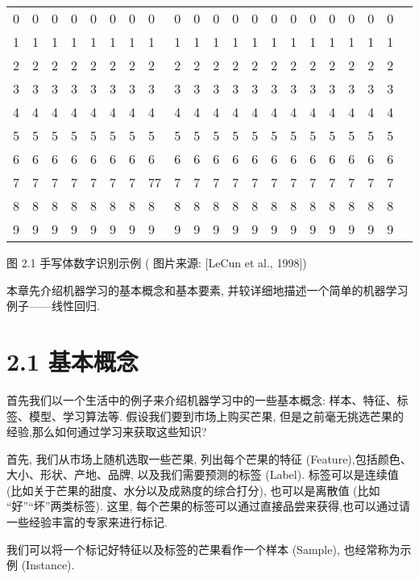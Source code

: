 \documentclass[10pt]{article}
\begin{document}
\begin{center}
\begin{tabular}{lllllllllllllllllllll}
0 & 0 & 0 & 0 & 0 & 0 & 0 & 0 & 0 & 0 & 0 & 0 & 0 & 0 & 0 & 0 & 0 & 0 & 0 & 0 \\
1 & 1 & 1 & 1 & 1 & 1 & 1 & 1 & 1 & 1 & 1 & 1 & 1 & 1 & 1 & 1 & 1 & 1 & 1 & 1 \\
2 & 2 & 2 & 2 & 2 & 2 & 2 & 2 & 2 & 2 & 2 & 2 & 2 & 2 & 2 & 2 & 2 & 2 & 2 & 2 \\
3 & 3 & 3 & 3 & 3 & 3 & 3 & 3 & 3 & 3 & 3 & 3 & 3 & 3 & 3 & 3 & 3 & 3 & 3 & 3 \\
4 & 4 & 4 & 4 & 4 & 4 & 4 & 4 & 4 & 4 & 4 & 4 & 4 & 4 & 4 & 4 & 4 & 4 & 4 & 4 \\
5 & 5 & 5 & 5 & 5 & 5 & 5 & 5 & 5 & 5 & 5 & 5 & 5 & 5 & 5 & 5 & 5 & 5 & 5 & 5 \\
6 & 6 & 6 & 6 & 6 & 6 & 6 & 6 & 6 & 6 & 6 & 6 & 6 & 6 & 6 & 6 & 6 & 6 & 6 & 6 \\
7 & 7 & 7 & 7 & 7 & 7 & 7 & 77 & 7 & 7 & 7 & 7 & 7 & 7 & 7 & 7 & 7 & 7 & 7 & 7 \\
8 & 8 & 8 & 8 & 8 & 8 & 8 & 8 & 8 & 8 & 8 & 8 & 8 & 8 & 8 & 8 & 8 & 8 & 8 & 8 \\
9 & 9 & 9 & 9 & 9 & 9 & 9 & 9 & 9 & 9 & 9 & 9 & 9 & 9 & 9 & 9 & 9 & 9 & 9 & 9 \\
\end{tabular}
\end{center}

图 2.1 手写体数字识别示例 ( 图片来源: [LeCun et al., 1998])

本章先介绍机器学习的基本概念和基本要素, 并较详细地描述一个简单的机器学习例子——线性回归.

\section*{2.1 基本概念}
首先我们以一个生活中的例子来介绍机器学习中的一些基本概念: 样本、特征、标签、模型、学习算法等. 假设我们要到市场上购买芒果, 但是之前毫无挑选芒果的经验,那么如何通过学习来获取这些知识?

首先, 我们从市场上随机选取一些芒果, 列出每个芒果的特征 (Feature),包括颜色、大小、形状、产地、品牌, 以及我们需要预测的标签 (Label). 标签可以是连续值 (比如关于芒果的甜度、水分以及成熟度的综合打分), 也可以是离散值 (比如 “好”“坏”两类标签). 这里, 每个芒果的标签可以通过直接品尝来获得,也可以通过请一些经验丰富的专家来进行标记.

我们可以将一个标记好特征以及标签的芒果看作一个样本 (Sample), 也经常称为示例 (Instance).
\end{document}
